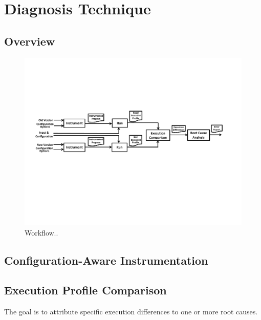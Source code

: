 \section{Diagnosis Technique}
\label{sec:technique}

\subsection{Overview}

\begin{figure}[t]
  \centerline{\includegraphics[scale=0.72]{workflow}}
  \vspace*{-2.0ex}\caption {{\label{fig:overview} Workflow..
}}
\end{figure}


\subsection{Configuration-Aware Instrumentation}

\subsection{Execution Profile Comparison}

The goal is to attribute specific execution differences
to one or more root causes.

